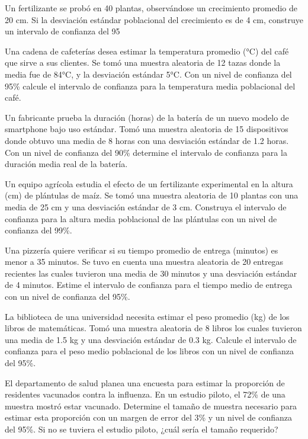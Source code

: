 \documentclass[addpoints,12pt]{exam}
\theoremstyle{plain}
\theoremstyle{remark}
\theoremstyle{definition}
\begin{document}
\begin{questions}
 \question Un fertilizante se probó en 40 plantas, observándose un crecimiento promedio de 20 cm. Si la desviación estándar poblacional del crecimiento es de 4 cm, construye un intervalo de confianza del 95%



 \question Una cadena de cafeterías desea estimar la temperatura promedio (°C) del café que sirve a sus clientes. Se tomó una muestra aleatoria de 12 tazas donde la media fue de 84°C, y la desviación estándar 5°C. Con un nivel de confianza del 95\% calcule el intervalo de confianza para la temperatura media poblacional del café.  

 \question Un fabricante prueba la duración (horas) de la batería de un nuevo modelo de smartphone bajo uso estándar. Tomó una muestra aleatoria de 15 dispositivos donde obtuvo una media de 8 horas con una desviación estándar de 1.2 horas. Con un nivel de confianza del 90\%  determine el intervalo de confianza para la duración media real de la batería.  

 \question Un equipo agrícola estudia el efecto de un fertilizante experimental en la altura (cm) de plántulas de maíz.  Se tomó una muestra aleatoria de 10 plantas con una media de 25 cm y una desviación estándar de 3 cm.  Construya el intervalo de confianza para la altura media poblacional de las plántulas con un nivel de confianza del 99\%.  

 \question Una pizzería quiere verificar si su tiempo promedio de entrega (minutos) es menor a 35 minutos. Se tuvo en cuenta una muestra aleatoria de 20 entregas recientes las cuales tuvieron una media de 30 minutos y una desviación estándar de 4 minutos.  Estime el intervalo de confianza para el tiempo medio de entrega con un nivel de confianza del 95\%.

 \question La biblioteca de una universidad necesita estimar el peso promedio (kg) de los libros de matemáticas. Tomó una muestra aleatoria de 8 libros los cuales tuvieron una media de 1.5 kg y una desviación estándar de 0.3 kg. Calcule el intervalo de confianza para el peso medio poblacional de los libros con un nivel de confianza del  95\%.  

 

 \question El departamento de salud planea una encuesta para estimar la proporción de residentes vacunados contra la influenza. En un estudio piloto, el 72\% de una muestra mostró estar vacunado. Determine el tamaño de muestra necesario para estimar esta proporción con un margen de error del 3\% y un nivel de confianza del 95\%. Si no se tuviera el estudio piloto, ¿cuál sería el tamaño requerido?


\end{questions}
\end{document}
